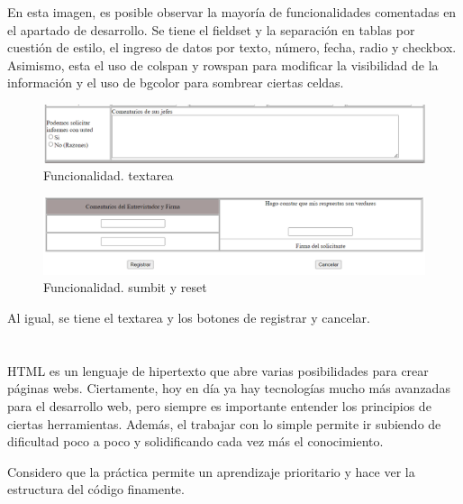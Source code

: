 \documentclass[10pt,a4paper]{article}
\begin{document}
En esta imagen, es posible observar la mayoría de funcionalidades comentadas en el apartado de desarrollo. Se tiene el fieldset y la separación en tablas por cuestión de estilo, el ingreso de datos por texto, número, fecha, radio y checkbox. Asimismo, esta el uso de colspan y rowspan para modificar la visibilidad de la información y el uso de bgcolor para sombrear ciertas celdas.

\begin{figure}[H]
	\includegraphics[scale=.54]{Capture13}
	\centering
	\caption{Funcionalidad. textarea}
	\label{img:Capture13}
\end{figure} 

\begin{figure}[H]
	\includegraphics[scale=.54]{Capture14}
	\centering
	\caption{Funcionalidad. sumbit y reset}
	\label{img:Capture14}
\end{figure} 

Al igual, se tiene el textarea y los botones de registrar y cancelar.

\pagebreak

\section{\color{colorIPN}{Conclusión}}
HTML es un lenguaje de hipertexto que abre varias posibilidades para crear páginas webs. Ciertamente, hoy en día ya hay tecnologías mucho más avanzadas para el desarrollo web, pero siempre es importante entender los principios de ciertas herramientas. Además, el trabajar con lo simple permite ir subiendo de dificultad poco a poco y solidificando cada vez más el conocimiento.

Considero que la práctica permite un aprendizaje prioritario y hace ver la estructura del código finamente.

\end{document}
